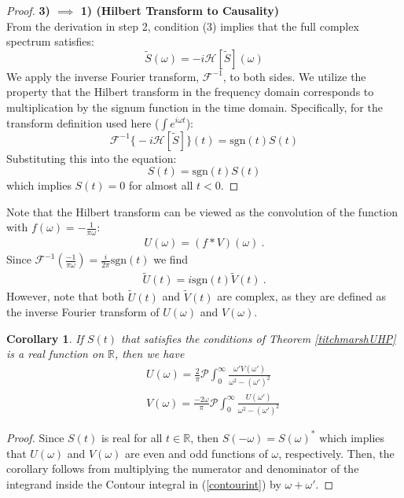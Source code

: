 \documentclass[a4paper,11pt]{article}
\newtheorem{corollary}[theorem]{Corollary}
\theoremstyle{definition}
\newcommand{\nn}{\nonumber}
\begin{document}
\begin{proof}
\vspace{0.5cm}
\textbf{3) $\implies$ 1) (Hilbert Transform to Causality)} \\
From the derivation in step 2, condition (3) implies that the full complex spectrum satisfies:
\begin{equation}
    \tilde{S}(\omega) = -i \mathcal{H}[\tilde{S}](\omega)
\end{equation}
We apply the inverse Fourier transform, $\mathcal{F}^{-1}$, to both sides. We utilize the property that the Hilbert transform in the frequency domain corresponds to multiplication by the signum function in the time domain. Specifically, for the transform definition used here ($\int e^{i\omega t}$):
\begin{equation}
    \mathcal{F}^{-1} \big\{ -i \mathcal{H}[\tilde{S}] \big\}(t) = \text{sgn}(t) S(t)
\end{equation}
Substituting this into the equation:
\begin{equation}
    S(t) = \text{sgn}(t) S(t)
\end{equation}
which implies $S(t) = 0$ for almost all $t < 0$. 
\end{proof}
Note that the Hilbert transform can be viewed as the convolution of the function with $f(\omega)=-\frac{1}{\pi\omega}$:
\begin{eqnarray}
    U(\omega)=(f*V)(\omega)\ .
\end{eqnarray}
Since $\mathcal{F}^{-1}(\frac{-1}{\pi \omega})=\frac{i}{2\pi}\text{sgn}(t)$ we find
\begin{eqnarray}
    \tilde{U}(t)=i\text{sgn}(t) \tilde{V}(t)\ .
\end{eqnarray}
However, note that both $\tilde{U}(t)$ and $\tilde{V}(t)$ are complex, as they are defined as the inverse Fourier transform of $U(\omega)$ and $V(\omega)$. 

\begin{corollary}
    If $S(t)$ that satisfies the conditions of Theorem \ref{titchmarshUHP} is a real function on $\mathbb{R}$, then we have
    \begin{eqnarray}
        &&U(\omega)=\frac{2}{\pi}\mathcal{P}\int_0^\infty \frac{\omega' V(\omega')}{\omega^2-(\omega')^2}\nn\\
        &&V(\omega)=\frac{-2\omega}{\pi}\mathcal{P}\int_0^\infty \frac{U(\omega')}{\omega^2-(\omega')^2}
    \end{eqnarray}
\end{corollary}
\begin{proof}
    Since $S(t)$ is real for all $t\in\mathbb{R}$, then $S(-\omega)=S(\omega)^*$ which implies that $U(\omega)$ and $V(\omega)$ are even and odd functions of $\omega$, respectively. Then, the corollary follows from multiplying the numerator and denominator of the integrand inside the Contour integral in (\ref{contourint}) by $\omega+\omega'$.
\end{proof}
\end{document}
